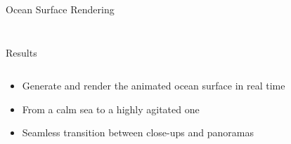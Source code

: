 \documentclass[final,hyperref={pdfpagelabels=true}]{beamer}
\begin{document}
\begin{frame}[fragile]
\begin{center}
\begin{minipage}{\textwidth}
\begin{block}{Ocean Surface Rendering}
\begin{columns}[t]
\begin{column}{0.95\linewidth}
\begin{figure}
					\end{figure}
				\end{column}
%					
%					
%					
%					
%					
			\end{columns}
		\end{block}
	\end{minipage}
	\begin{minipage}{\textwidth}
		\begin{block}{Results}
			\begin{columns}[t]
				\begin{column}{0.4\linewidth}
				\begin{itemize}
				\item Generate and render the animated ocean surface in real time
				\item From a calm sea to a highly agitated one
				\item Seamless transition between close-ups and panoramas
				\end{itemize}

\end{column}
\end{columns}
\end{block}
\end{minipage}
\end{center}
\end{frame}
\end{document}
